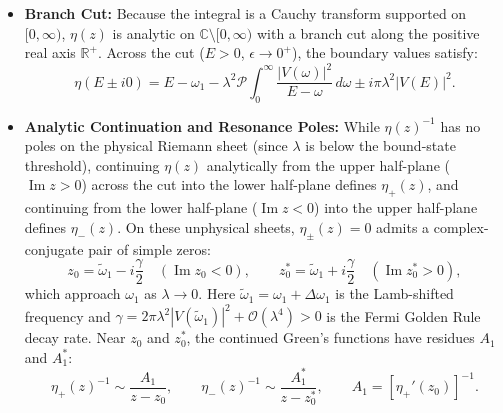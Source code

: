 \documentclass[11pt,a4paper]{article}
\begin{document}
\begin{itemize}
    \item \textbf{Branch Cut:} Because the integral is a Cauchy transform supported on $[0, \infty)$, $\eta(z)$ is analytic on $\mathbb{C} \setminus [0, \infty)$ with a branch cut along the positive real axis $\mathbb{R}^+$. Across the cut ($E > 0$, $\epsilon \to 0^+$), the boundary values satisfy:
    \begin{equation}
    \eta(E \pm i0) = E - \omega_1 - \lambda^2 \mathcal{P}\int_0^\infty \frac{|V(\omega)|^2}{E - \omega} \, d\omega \pm i\pi \lambda^2 |V(E)|^2.
    \end{equation}
    \item \textbf{Analytic Continuation and Resonance Poles:} While $\eta(z)^{-1}$ has no poles on the physical Riemann sheet (since $\lambda$ is below the bound-state threshold), continuing $\eta(z)$ analytically from the upper half-plane ($\operatorname{Im} z > 0$) across the cut into the lower half-plane defines $\eta_+(z)$, and continuing from the lower half-plane ($\operatorname{Im} z < 0$) into the upper half-plane defines $\eta_-(z)$. On these unphysical sheets, $\eta_\pm(z) = 0$ admits a complex-conjugate pair of simple zeros:
    \begin{equation}
    z_0 = \tilde{\omega}_1 - i\frac{\gamma}{2} \quad (\operatorname{Im} z_0 < 0), \qquad z_0^* = \tilde{\omega}_1 + i\frac{\gamma}{2} \quad (\operatorname{Im} z_0^* > 0),
    \end{equation}
    which approach $\omega_1$ as $\lambda \to 0$. Here $\tilde{\omega}_1 = \omega_1 + \Delta \omega_1$ is the Lamb-shifted frequency and $\gamma = 2\pi\lambda^2 |V(\tilde{\omega}_1)|^2 + \mathcal{O}(\lambda^4) > 0$ is the Fermi Golden Rule decay rate. Near $z_0$ and $z_0^*$, the continued Green's functions have residues $A_1$ and $A_1^*$:
    \begin{equation}
    \eta_+(z)^{-1} \sim \frac{A_1}{z - z_0}, \qquad \eta_-(z)^{-1} \sim \frac{A_1^*}{z - z_0^*}, \qquad A_1 = \left[\eta_+'(z_0)\right]^{-1}.
    \end{equation}
\end{itemize}
\end{document}
